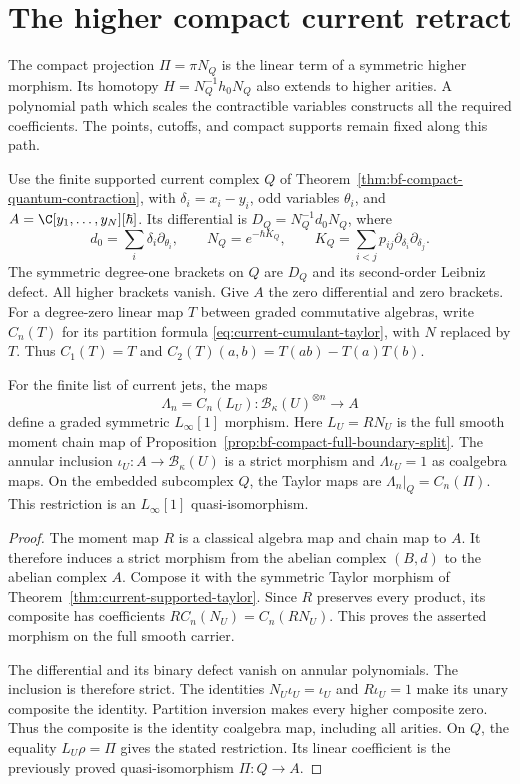 \section{The higher compact current retract}
\label{sec:current-higher-retract}

The compact projection $\Pi=\pi N_Q$ is the linear term of a
symmetric higher morphism.  Its homotopy $H=N_Q^{-1}h_0N_Q$ also
extends to higher arities.  A polynomial path which scales the
contractible variables constructs all the required coefficients.
The points, cutoffs, and compact supports remain fixed along this path.

Use the finite supported current complex $Q$ of
Theorem~\ref{thm:bf-compact-quantum-contraction}, with
$\delta_i=x_i-y_i$, odd variables $\theta_i$, and
$A=\C[y_1,\ldots,y_N][\hbar]$.
Its differential is $D_Q=N_Q^{-1}d_0N_Q$, where
\[
 d_0=\sum_i\delta_i\partial_{\theta_i},\qquad
 N_Q=e^{-\hbar K_Q},\qquad
 K_Q=\sum_{i<j}p_{ij}\partial_{\delta_i}\partial_{\delta_j}.
\]
The symmetric degree-one brackets on $Q$ are $D_Q$ and its
second-order Leibniz defect.  All higher brackets vanish.
Give $A$ the zero differential and zero brackets.
For a degree-zero linear map $T$ between graded commutative algebras,
write $C_n(T)$ for its partition formula
\eqref{eq:current-cumulant-taylor}, with $N$ replaced by $T$.
Thus $C_1(T)=T$ and $C_2(T)(a,b)=T(ab)-T(a)T(b)$.

\begin{proposition}
\label{prop:current-higher-moment-projection}
For the finite list of current jets, the maps
\[
 \Lambda_n=C_n(L_U):\mathcal B_\kappa(U)^{\otimes n}\longrightarrow A
\]
define a graded symmetric $L_\infty[1]$ morphism.
Here $L_U=RN_U$ is the full smooth moment chain map of
Proposition~\ref{prop:bf-compact-full-boundary-split}.
The annular inclusion $\iota_U:A\to\mathcal B_\kappa(U)$ is a
strict morphism and $\Lambda\iota_U=1$ as coalgebra maps.
On the embedded subcomplex $Q$, the Taylor maps are
$\Lambda_n|_Q=C_n(\Pi)$.
This restriction is an $L_\infty[1]$ quasi-isomorphism.
\end{proposition}
\begin{proof}
The moment map $R$ is a classical algebra map and chain map to $A$.
It therefore induces a strict morphism from the abelian complex
$(B,d)$ to the abelian complex $A$.
Compose it with the symmetric Taylor morphism of
Theorem~\ref{thm:current-supported-taylor}.
Since $R$ preserves every product, its composite has coefficients
$R C_n(N_U)=C_n(RN_U)$.
This proves the asserted morphism on the full smooth carrier.

The differential and its binary defect vanish on annular polynomials.
The inclusion is therefore strict.  The identities
$N_U\iota_U=\iota_U$ and $R\iota_U=1$ make its unary composite
the identity.  Partition inversion makes every higher composite zero.
Thus the composite is the identity coalgebra map, including all arities.
On $Q$, the equality $L_U\rho=\Pi$ gives the stated restriction.
Its linear coefficient is the previously proved quasi-isomorphism
$\Pi:Q\to A$.
\end{proof}


